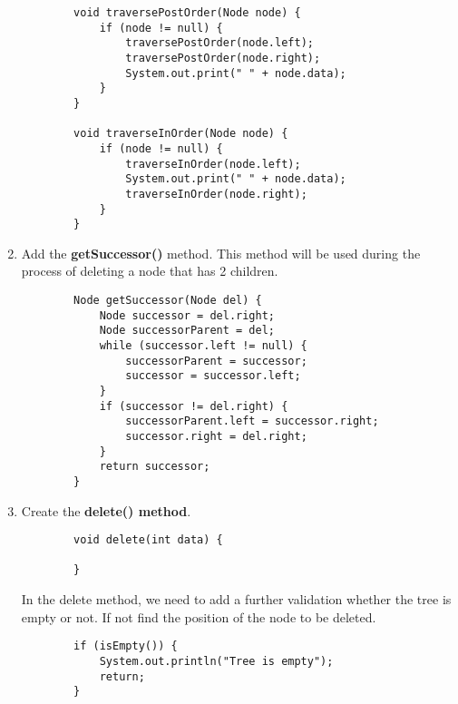 \documentclass[12pt,titlepage]{article}
\begin{document}
\begin{enumerate}
\begin{verbatim}
        void traversePostOrder(Node node) {
            if (node != null) {
                traversePostOrder(node.left);
                traversePostOrder(node.right);
                System.out.print(" " + node.data);
            }
        }

        void traverseInOrder(Node node) {
            if (node != null) {
                traverseInOrder(node.left);
                System.out.print(" " + node.data);
                traverseInOrder(node.right);
            }
        }
    \end{verbatim}
    \item Add the \textbf{getSuccessor()} method. This method will be used during the process of deleting a node that has 2 children.
    \begin{verbatim}
        Node getSuccessor(Node del) {
            Node successor = del.right;
            Node successorParent = del;
            while (successor.left != null) {
                successorParent = successor;
                successor = successor.left;
            }
            if (successor != del.right) {
                successorParent.left = successor.right;
                successor.right = del.right;
            }
            return successor;
        }
    \end{verbatim}
    \item Create the \textbf{delete() method}.
    \begin{verbatim}
        void delete(int data) {

        }
    \end{verbatim}
    In the delete method, we need to add a further validation whether the tree is empty or not. If not find the position of the node to be deleted.
    \begin{verbatim}
        if (isEmpty()) {
            System.out.println("Tree is empty");
            return;
        }


\end{verbatim}
\end{enumerate}
\end{document}
